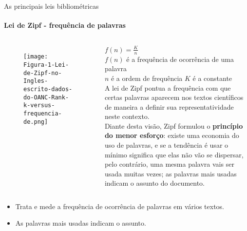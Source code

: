 \begin{frame}[t]{As principais leis bibliométricas}
    \framesubtitle{Lei de Zipf - frequência de palavras}



    \begin{columns}

        \begin{figure}
            \texttt{[image: Figura-1-Lei-de-Zipf-no-Ingles-escrito-dados-do-OANC-Rank-k-versus-frequencia-de.png]}
        \end{figure}

        \centering
        $f(n) = \frac{K}{n}$\\
        $f(n)$ \scriptsize{é a frequência de ocorrência de uma palavra}\\
        $n$ \scriptsize{é a ordem de frequência}
        $K$ \scriptsize{é a constante}\\

        A lei de Zipf pontua a frequência com que certas palavras aparecem nos textos científicos de maneira a definir sua representatividade neste contexto.\\
        \scriptsize{
            Diante desta visão, Zipf formulou o \textbf{princípio do menor esforço}: existe uma economia do uso de palavras, e se a tendência é usar o mínimo significa que elas não vão se dispersar, pelo contrário, uma mesma palavra vais ser usada muitas vezes; as palavras mais usadas indicam o assunto do documento.
        }
    \end{columns}

    \vspace*{0.2cm}
    \begin{itemize}
        \item Trata e mede a frequência de ocorrência de palavras em vários textos.
        \item As palavras mais usadas indicam o assunto.
    \end{itemize}
\end{frame}
